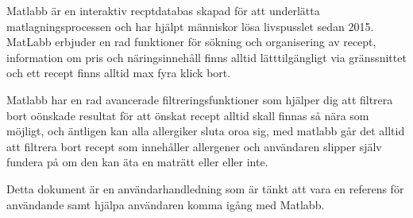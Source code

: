 Matlabb är en interaktiv recptdatabas skapad för att underlätta
matlagningsprocessen och har hjälpt människor lösa livspusslet sedan
2015. MatLabb erbjuder en rad funktioner för sökning och organisering
av recept, information om pris och näringsinnehåll finns alltid
lätttilgängligt via gränssnittet och ett recept finns alltid max fyra
klick bort.

Matlabb har en rad avancerade filtreringsfunktioner som hjälper dig
att filtrera bort oönskade resultat för att önskat recept alltid
skall finnas så nära som möjligt, och äntligen kan alla allergiker
sluta oroa sig, med matlabb går det alltid att filtrera bort recept
som innehåller allergener och användaren slipper själv fundera på om
den kan äta en maträtt eller eller inte.

Detta dokument är en användarhandledning som är tänkt att vara en
referens för användande samt hjälpa användaren komma igång med Matlabb.

